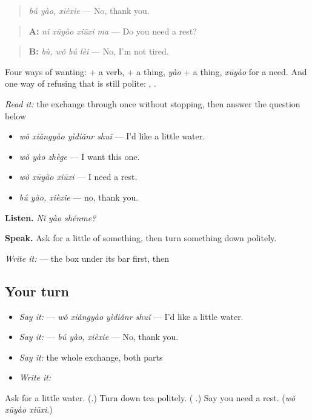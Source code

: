 \begin{quote}
\emph{bú yào, xièxie} — No, thank you.
\end{quote}

\begin{quote}
\textbf{A:} \emph{nǐ xūyào xiūxi ma} — Do you need a rest?
\end{quote}

\begin{quote}
\textbf{B:} \emph{bù, wǒ bú lèi} — No, I'm not tired.
\end{quote}

Four ways of wanting:  + a verb,  + a thing, \emph{yào} + a thing, \emph{xūyào} for a need. And one way of refusing that is still polite: , .

\begin{tcolorbox}[breakable,skin=enhanced,colback=orange!6,colframe=orange!45!black,boxrule=0.5pt,arc=1mm,left=6pt,right=6pt,top=4pt,bottom=4pt,fonttitle=\bfseries,title={Read this}]
\emph{Read it:} the exchange through once without stopping, then answer the question below
\end{tcolorbox}

\begin{grammarlens}[title={What you've built — wanting, needing, refusing}]
\begin{itemize}
\raggedright
  \item \textbf{} \emph{wǒ xiǎngyào yìdiǎnr shuǐ} — I'd like a little water.
  \item \textbf{} \emph{wǒ yào zhège} — I want this one.
  \item \emph{wǒ xūyào xiūxi} — I need a rest.
  \item \textbf{ } \emph{bú yào, xièxie} — no, thank you.
\end{itemize}

\textbf{Listen.} \emph{Nǐ yào shénme?}

\textbf{Speak.} Ask for a little of something, then turn something down politely.

\emph{Write it:}  — the box under its bar first, then 
\end{grammarlens}

\subsection*{Your turn}
\begin{itemize}
\raggedright
  \item \emph{Say it:}  — \emph{wǒ xiǎngyào yìdiǎnr shuǐ} — I'd like a little water.
  \item \emph{Say it:}   — \emph{bú yào, xièxie} — No, thank you.
  \item \emph{Say it:} the whole exchange, both parts
  \item \emph{Write it:} 
\end{itemize}

\begin{tcolorbox}[breakable,colback=teal!4,colframe=teal!35!black,title={Before you move on}]
Ask for a little water. (\textbf{}.) Turn down tea politely. (\textbf{ }.) Say you need a rest. (\emph{wǒ xūyào xiūxi}.)
\end{tcolorbox}
